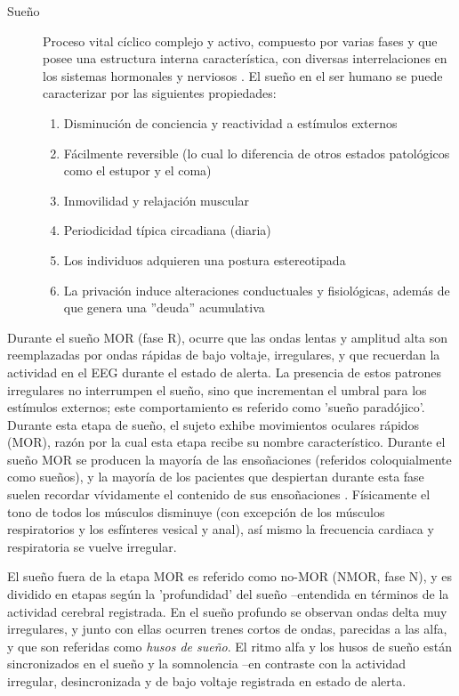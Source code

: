 \documentclass[12pt,a4paper]{mitthesis}
\begin{document}
\begin{description}
\item[Sue\~no] Proceso vital c\'iclico complejo y activo, compuesto por varias fases y que posee 
una estructura interna caracter\'istica, con diversas interrelaciones en los sistemas hormonales y 
nerviosos \cite{FernandezConde07}.
El sue\~no en el ser humano se puede caracterizar por las siguientes propiedades\cite{CarrilloMora}:
\begin{enumerate}
\item Disminuci\'on de conciencia y reactividad a est\'imulos externos
\item F\'acilmente reversible (lo cual lo diferencia de otros estados 
patol\'ogicos como el estupor y el coma)
\item Inmovilidad y relajaci\'on muscular
\item Periodicidad t\'ipica circadiana (diaria)
\item Los individuos adquieren una postura estereotipada
\item La privaci\'on induce alteraciones conductuales y 
fisiol\'ogicas, adem\'as de que genera una ''deuda'' acumulativa
\end{enumerate}
\end{description}

Durante el sue\~no MOR (fase R), ocurre que las ondas lentas y amplitud alta son reemplazadas por 
ondas r\'apidas de bajo voltaje, irregulares, y que recuerdan la actividad en el EEG durante el 
estado de alerta.
La presencia de estos patrones irregulares no interrumpen el sue\~no, sino que incrementan el 
umbral para los est\'imulos externos; este comportamiento es referido como 'sue\~no parad\'ojico'.
Durante esta etapa de sue\~no, el sujeto exhibe movimientos oculares r\'apidos (MOR), raz\'on por 
la cual esta etapa recibe su nombre caracter\'istico.
Durante el sue\~no MOR se producen la mayor\'ia de las enso\~naciones (referidos coloquialmente 
como sue\~nos), y la mayor\'ia de los pacientes que despiertan durante esta fase suelen recordar 
v\'ividamente el contenido de sus enso\~naciones \cite{Chokroverty09}.
F\'isicamente el tono de todos los m\'usculos disminuye (con excepción de los m\'usculos 
respiratorios y los esf\'interes vesical y anal), as\'i mismo la frecuencia cardiaca y respiratoria 
se vuelve irregular.

El sue\~no fuera de la etapa MOR es referido como no-MOR (NMOR, fase N), y es dividido en etapas 
seg\'un la 'profundidad' del sue\~no --entendida en t\'erminos de la actividad cerebral registrada.
En el sue\~no profundo se observan ondas delta muy irregulares, y junto con ellas ocurren trenes 
cortos de ondas, parecidas a las alfa, y que son referidas como \textit{husos de sue\~no}. 
El ritmo alfa y los husos de sue\~no est\'an sincronizados en el sue\~no y la somnolencia 
--en contraste con la actividad irregular, desincronizada y de bajo voltaje registrada en estado de 
alerta.
\end{document}
